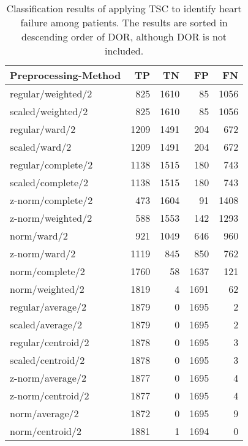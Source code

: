 \begin{longtable}{lrrrr}
    \caption{Classification results of applying TSC to identify heart failure among patients.
             The results are sorted in descending order of DOR, although DOR is not included.}
    \label{tab:tsc_segm_ind_raw_results}\\
    \hline
    Preprocessing-Method &     TP &    TN &    FP &    FN \\
    \hline
    regular/weighted/2   &  825 & 1610 &   85 & 1056 \\
    scaled/weighted/2    &  825 & 1610 &   85 & 1056 \\
    regular/ward/2       & 1209 & 1491 &  204 &  672 \\
    scaled/ward/2        & 1209 & 1491 &  204 &  672 \\
    regular/complete/2   & 1138 & 1515 &  180 &  743 \\
    scaled/complete/2    & 1138 & 1515 &  180 &  743 \\
    z-norm/complete/2    &  473 & 1604 &   91 & 1408 \\
    z-norm/weighted/2    &  588 & 1553 &  142 & 1293 \\
    norm/ward/2          &  921 & 1049 &  646 &  960 \\
    z-norm/ward/2        & 1119 &  845 &  850 &  762 \\
    norm/complete/2      & 1760 &   58 & 1637 &  121 \\
    norm/weighted/2      & 1819 &    4 & 1691 &   62 \\
    regular/average/2    & 1879 &    0 & 1695 &    2 \\
    scaled/average/2     & 1879 &    0 & 1695 &    2 \\
    regular/centroid/2   & 1878 &    0 & 1695 &    3 \\
    scaled/centroid/2    & 1878 &    0 & 1695 &    3 \\
    z-norm/average/2     & 1877 &    0 & 1695 &    4 \\
    z-norm/centroid/2    & 1877 &    0 & 1695 &    4 \\
    norm/average/2       & 1872 &    0 & 1695 &    9 \\
    norm/centroid/2      & 1881 &    1 & 1694 &    0 \\
    \hline
\end{longtable}
